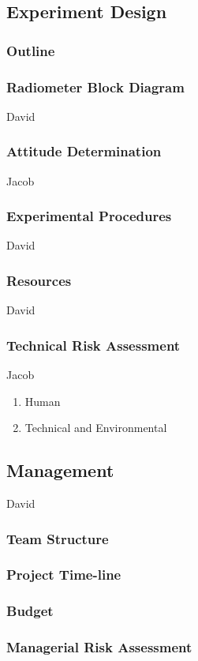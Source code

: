 \documentclass[12pt]{article}
\begin{document}
\subsection{Experiment Design}
\subsubsection{Outline}

\subsubsection{Radiometer Block Diagram}
David
\subsubsection{Attitude Determination}
Jacob
\subsubsection{Experimental Procedures}
David
\subsubsection{Resources}
David
\subsubsection{Technical Risk Assessment}
Jacob
\begin{enumerate}
\item Human
\cite{omar_el-kassaby_abdelghaffar_2017}
\item Technical and Environmental
\end{enumerate}
\subsection{Management}
David
\subsubsection{Team Structure}
\subsubsection{Project Time-line}
\subsubsection{Budget}
\subsubsection{Managerial Risk Assessment}
\end{document}
